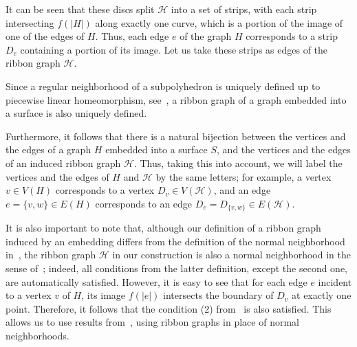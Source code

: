 \documentclass[a4paper,12pt,reqno,oneside]{amsart}
\theoremstyle{plain}
\theoremstyle{definition}
\theoremstyle{plain}
\newcommand{\HH}{\mathcal{H}}
\begin{document}
It can be seen that these discs split $\HH$ into a set of strips, with each strip intersecting
$f(|H|)$ along exactly one curve, which is a portion of the image of one of the edges of $H$. Thus,
each edge $e$ of the graph $H$ corresponds to a strip $D_e$ containing a portion of its image. Let
us take these strips as edges of the ribbon graph $\HH$.

Since a regular neighborhood of a subpolyhedron is uniquely defined up to piecewise linear
homeomorphism, see~\cite[Theorem~3.8]{rourke_sanderson}, a ribbon graph of a graph embedded into a
surface is also uniquely defined.

Furthermore, it follows that there is a natural bijection between the vertices and the edges of a
graph $H$ embedded into a surface $S$, and the vertices and the edges of an induced ribbon graph
$\HH$. Thus, taking this into account, we will label the vertices and the edges of $H$ and $\HH$ by
the same letters; for example, a vertex $v \in V(H)$ corresponds to a vertex $D_v \in V(\HH)$, and an edge
$e = \{v, w\} \in E(H)$ corresponds to an edge $D_e = D_{\{v, w\}} \in E(\HH)$.

It is also important to note that, although our definition of a ribbon graph induced by an
embedding differs from the definition of the normal neighborhood in~\cite{minc}, the ribbon graph
$\HH$ in our construction is also a normal neighborhood in the sense of~\cite[Definition
2.4]{minc}; indeed, all conditions from the latter definition, except the second one, are
automatically satisfied. However, it is easy to see that for each edge $e$ incident to a vertex $v$
of $H$, its image $f(|e|)$ intersects the boundary of $D_v$ at exactly one point. Therefore, it
follows that the condition (2) from~\cite[Definition 2.4]{minc} is also satisfied. This allows us to
use results from~\cite{minc}, using ribbon graphs in place of normal neighborhoods.
\end{document}

